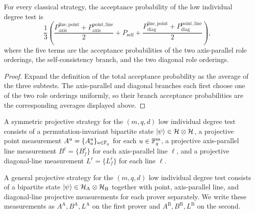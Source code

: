 \begin{lemma}\label{fig:test}
	\leanok
	For every classical strategy, the acceptance probability of the low individual degree test is
	\[
		\frac13\left(\frac{P^{\mathrm{line,point}}_{\mathrm{axis}}+P^{\mathrm{point,line}}_{\mathrm{axis}}}{2}
		+P_{\mathrm{self}}
		+\frac{P^{\mathrm{line,point}}_{\mathrm{diag}}+P^{\mathrm{point,line}}_{\mathrm{diag}}}{2}\right),
	\]
	where the five terms are the acceptance probabilities of the two axis-parallel role orderings, the self-consistency branch, and the two diagonal role orderings.
\end{lemma}
\begin{proof}
	\leanok
	Expand the definition of the total acceptance probability as the average of
	the three subtests.  The axis-parallel and diagonal branches each first
	choose one of the two role orderings uniformly, so their branch acceptance
	probabilities are the corresponding averages displayed above.
\end{proof}

\begin{definition}\label{def:symmetric-projective-strategy}
	\leanok
	A symmetric projective strategy for the $(m,q,d)$ low individual degree test consists of a permutation-invariant bipartite state $\lvert \psi \rangle \in \mathcal H \otimes \mathcal H$, a projective point measurement $A^u=\{A^u_a\}_{a \in \mathbb{F}_q}$ for each $u \in \mathbb{F}_q^m$, a projective axis-parallel line measurement $B^\ell=\{B^\ell_f\}$ for each axis-parallel line $\ell$, and a projective diagonal-line measurement $L^\ell=\{L^\ell_f\}$ for each line $\ell$.
\end{definition}

\begin{definition}\label{def:projective-strategy}
	\leanok
	A general projective strategy for the $(m,q,d)$ low individual degree test consists of a bipartite state $\lvert \psi \rangle \in \mathcal H_{\mathrm A} \otimes \mathcal H_{\mathrm B}$ together with point, axis-parallel line, and diagonal-line projective measurements for each prover separately. We write these measurements as $A^{\mathrm A}, B^{\mathrm A}, L^{\mathrm A}$ on the first prover and $A^{\mathrm B}, B^{\mathrm B}, L^{\mathrm B}$ on the second.
\end{definition}

